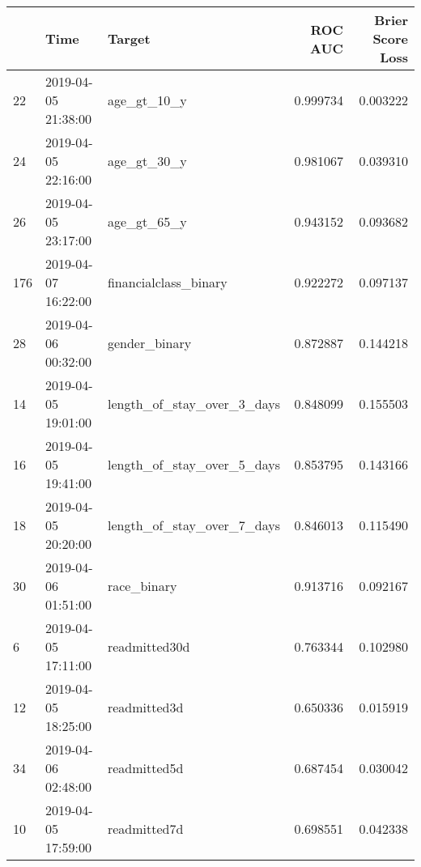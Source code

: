 \begin{tabular}{lllrr}
\toprule
{} &                Time &                      Target &   ROC AUC &  Brier Score Loss \\
\midrule
22  & 2019-04-05 21:38:00 &                 age\_gt\_10\_y &  0.999734 &          0.003222 \\
24  & 2019-04-05 22:16:00 &                 age\_gt\_30\_y &  0.981067 &          0.039310 \\
26  & 2019-04-05 23:17:00 &                 age\_gt\_65\_y &  0.943152 &          0.093682 \\
176 & 2019-04-07 16:22:00 &       financialclass\_binary &  0.922272 &          0.097137 \\
28  & 2019-04-06 00:32:00 &               gender\_binary &  0.872887 &          0.144218 \\
14  & 2019-04-05 19:01:00 &  length\_of\_stay\_over\_3\_days &  0.848099 &          0.155503 \\
16  & 2019-04-05 19:41:00 &  length\_of\_stay\_over\_5\_days &  0.853795 &          0.143166 \\
18  & 2019-04-05 20:20:00 &  length\_of\_stay\_over\_7\_days &  0.846013 &          0.115490 \\
30  & 2019-04-06 01:51:00 &                 race\_binary &  0.913716 &          0.092167 \\
6   & 2019-04-05 17:11:00 &               readmitted30d &  0.763344 &          0.102980 \\
12  & 2019-04-05 18:25:00 &                readmitted3d &  0.650336 &          0.015919 \\
34  & 2019-04-06 02:48:00 &                readmitted5d &  0.687454 &          0.030042 \\
10  & 2019-04-05 17:59:00 &                readmitted7d &  0.698551 &          0.042338 \\
\bottomrule
\end{tabular}
